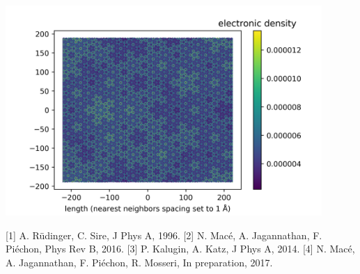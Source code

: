 \documentclass[a4paper,10pt]{article}
\begin{document}
\vspace{0cm}
\begin{center}
\includegraphics[width=0.9\textwidth]{taylor_9_groundstate.png}
\end{center}
[1] A. Rüdinger, C. Sire, J Phys A, 1996. 
[2] N. Macé, A. Jagannathan, F. Piéchon, Phys Rev B, 2016.
[3] P. Kalugin, A. Katz, J Phys A, 2014.
[4] N. Macé, A. Jagannathan, F. Piéchon, R. Mosseri, In preparation, 2017.
\end{document}
